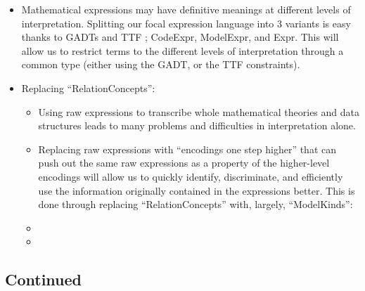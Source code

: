 \begin{itemize}

	\item Mathematical expressions may have definitive meanings at different
	      levels of interpretation. Splitting our focal expression language into
	      3 variants is easy thanks to GADTs and TTF \cite{carette2009finally};
	      CodeExpr, ModelExpr, and Expr. This will allow us to restrict terms to
	      the different levels of interpretation through a common type (either
	      using the GADT, or the TTF constraints).

	\item Replacing ``RelationConcepts'':

	      \begin{itemize}

		      \item Using raw expressions to transcribe whole mathematical
		            theories and data structures leads to many problems and
		            difficulties in interpretation alone.

		      \item Replacing raw expressions with ``encodings one step higher''
		            that can push out the same raw expressions as a property of
		            the higher-level encodings will allow us to quickly
		            identify, discriminate, and efficiently use the information
		            originally contained in the expressions better. This is done
		            through replacing ``RelationConcepts'' with, largely,
		            ``ModelKinds'':

			  \item \currentModelKindsHaskell
			  
			  \item {}

	      \end{itemize}

\end{itemize}

\subsection{Continued}

